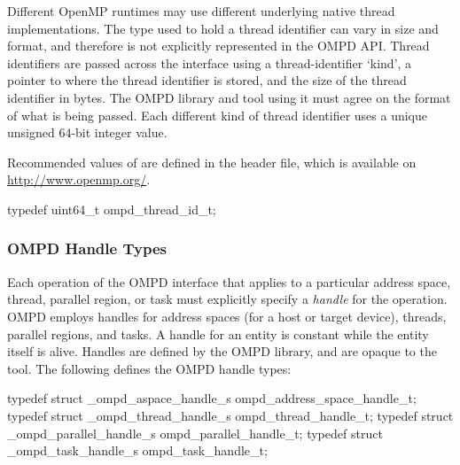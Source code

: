 Different OpenMP runtimes may use different underlying native
thread implementations.
The type used to hold a thread identifier can vary in size and format, and
therefore is not explicitly represented in the OMPD API. Thread identifiers are
passed across the interface using a thread-identifier `kind', a pointer to where
the thread identifier is stored, and the size of the thread identifier in bytes.
The OMPD library and tool using it must agree on the format
of what is being passed.
Each different kind of thread identifier uses a unique
unsigned 64-bit integer value.

Recommended values of  are defined in the 
header file, which is available on \url{http://www.openmp.org/}.

\label{ompd:ompd_thread_id_t}
\format

\begin{ccppspecific}
\begin{ompSyntax}
typedef uint64_t ompd_thread_id_t;
\end{ompSyntax}
\end{ccppspecific}


\subsubsection{OMPD Handle Types}
\label{subsubsec:ompd_address_space_handle_t}
\label{subsubsec:ompd_thread_handle_t}
\label{subsubsec:ompd_parallel_handle_t}
\label{subsubsec:ompd_task_handle_t}

Each operation of the OMPD interface that applies to a particular address space, thread, parallel
region, or task must explicitly specify
a \emph{handle} for the operation.
OMPD employs handles for address spaces (for a host or target device), threads, parallel regions,
and tasks. A handle for an entity is constant while the entity itself is alive. Handles are defined by
the OMPD library, and are opaque to the tool. The following defines the OMPD
handle types:

\format

\begin{ccppspecific}
\begin{ompSyntax}
typedef struct _ompd_aspace_handle_s
   ompd_address_space_handle_t;
typedef struct _ompd_thread_handle_s ompd_thread_handle_t;
typedef struct _ompd_parallel_handle_s ompd_parallel_handle_t;
typedef struct _ompd_task_handle_s ompd_task_handle_t;
\end{ompSyntax}
\end{ccppspecific}


